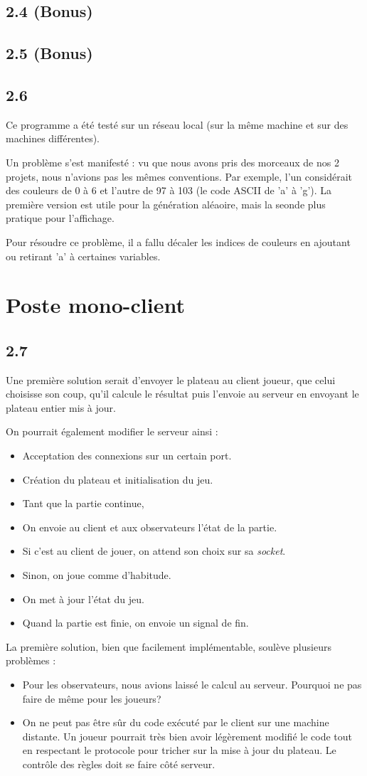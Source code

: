 \documentclass[12pt]{article}
\def\question#1{\subsection{#1}}
\def\sec#1{\section{#1}}
\begin{document}
  

\question{2.4 (Bonus)}


\question{2.5 (Bonus)}

\question{2.6} %

Ce programme a été testé sur un réseau local (sur la même machine et sur des machines différentes).

Un problème s'est manifesté : vu que nous avons pris des morceaux de nos 2 projets, nous n'avions pas les mêmes conventions. Par exemple, l'un considérait des couleurs de 0 à 6 et l'autre de 97 à 103 (le code ASCII de 'a' à 'g'). La première version est utile pour la génération aléaoire, mais la seonde plus pratique pour l'affichage.

Pour résoudre ce problème, il a fallu décaler les indices de couleurs en ajoutant ou retirant 'a' à certaines variables.


\sec{Poste mono-client}
\question{2.7}
Une première solution serait d'envoyer le plateau au client joueur, que celui choisisse son coup, qu'il calcule le résultat puis l'envoie au serveur en envoyant le plateau entier mis à jour.


On pourrait également modifier le serveur ainsi :
\begin{itemize}
  \item Acceptation des connexions sur un certain port.
  \item Création du plateau et initialisation du jeu.
  \item Tant que la partie continue,
  \item On envoie au client et aux observateurs l'état de la partie.
  \item Si c'est au client de jouer, on attend son choix sur sa \textit{socket}.
  \item Sinon, on joue comme d'habitude.
  \item On met à jour l'état du jeu.
  \item Quand la partie est finie, on envoie un signal de fin.
\end{itemize}


La première solution, bien que facilement implémentable, soulève plusieurs problèmes :
\begin{itemize}
\item Pour les observateurs, nous avions laissé le calcul au serveur. Pourquoi ne pas faire de même pour les joueurs?
\item On ne peut pas être sûr du code exécuté par le client sur une machine distante. Un joueur pourrait très bien avoir légèrement modifié le code tout en respectant le protocole pour tricher sur la mise à jour du plateau. Le contrôle des règles doit se faire côté serveur.
\end{itemize}
\end{document}
